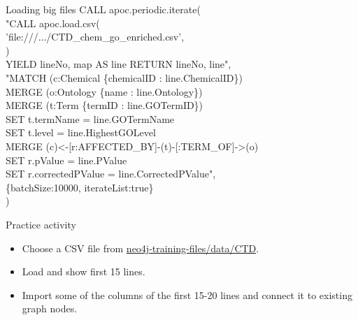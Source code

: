 \documentclass[12pt]{beamer}
\begin{document}
    \begin{frame}{Loading big files}
        CALL apoc.periodic.iterate(\\
        \hspace{1cm} "CALL apoc.load.csv(\\
        \hspace{3cm} 'file:///.../CTD\_chem\_go\_enriched.csv',\\
        \hspace{1cm} {})\\
        \hspace{1cm} YIELD lineNo, map AS line RETURN lineNo, line",\\
        \hspace{1cm} "MATCH (c:Chemical \{chemicalID : line.ChemicalID\})\\
        \hspace{1cm} MERGE (o:Ontology \{name : line.Ontology\})\\
        \hspace{1cm} MERGE (t:Term \{termID : line.GOTermID\})\\
        \hspace{3cm} SET t.termName = line.GOTermName\\
        \hspace{3cm} SET t.level = line.HighestGOLevel\\
        \hspace{1cm} MERGE (c)\textless-[r:AFFECTED\_BY]-(t)-[:TERM\_OF]-\textgreater(o)\\
        \hspace{2cm} SET r.pValue = line.PValue\\
        \hspace{2cm} SET r.correctedPValue = line.CorrectedPValue",\\
        \hspace{1cm} \{batchSize:10000, iterateList:true\}\\
        )
    \end{frame}
    
    \begin{frame}{Practice activity}
        \begin{itemize}
            \item Choose a CSV file from \url{neo4j-training-files/data/CTD}.
            \item Load and show first 15 lines.
            \item Import some of the columns of the first 15-20 lines and connect it to existing graph nodes.
        \end{itemize}
    \end{frame}
    
\end{document}
